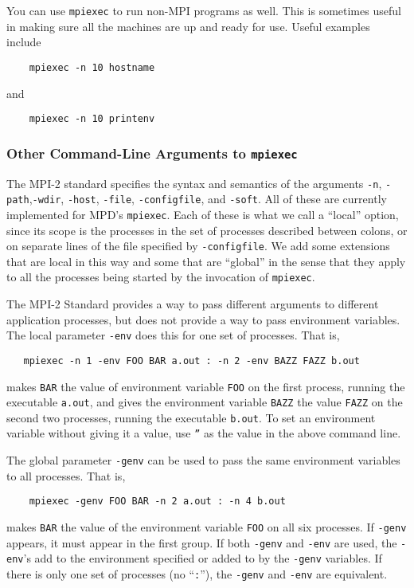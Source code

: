 \documentclass[dvipdfm,11pt]{article}
\begin{document}
You can use \texttt{mpiexec} to run non-MPI programs as well.  This is
sometimes useful in making sure all the machines are up and ready for
use.  Useful examples include
\begin{verbatim}
    mpiexec -n 10 hostname
\end{verbatim}
and
\begin{verbatim}
    mpiexec -n 10 printenv
\end{verbatim}


\subsubsection{Other Command-Line Arguments to \texttt{mpiexec}}
\label{sec:environment}

The MPI-2 standard specifies the syntax and semantics of the arguments
\texttt{-n}, \texttt{-path},\texttt{-wdir}, \texttt{-host},
\texttt{-file}, \texttt{-configfile}, and \texttt{-soft}.  All of these
are currently implemented for MPD's \texttt{mpiexec}.
Each of these is what we call a ``local'' option, since
its scope is the processes in the set of processes described between
colons, or on separate lines of the file specified by
\texttt{-configfile}.  We add some extensions that are local in this way
and some that are ``global'' in the sense that they apply to all the
processes being started by the invocation of \texttt{mpiexec}.

The MPI-2 Standard provides a way to pass different arguments to different
application processes, but does not provide a way to pass environment
variables.  The local parameter \texttt{-env} does this for one set of
processes.  That is,
\begin{verbatim}
   mpiexec -n 1 -env FOO BAR a.out : -n 2 -env BAZZ FAZZ b.out
\end{verbatim}
makes \texttt{BAR} the value of environment variable \texttt{FOO} on the
first process, running the executable \texttt{a.out}, and gives the
environment variable \texttt{BAZZ} the value \texttt{FAZZ} on the second
two processes, running the executable \texttt{b.out}.  To set an
environment variable without giving it a value, use \texttt{''} as the
value in the above command line.

The global parameter \texttt{-genv} can be used to pass the same
environment variables to all processes.  That is,
\begin{verbatim}
    mpiexec -genv FOO BAR -n 2 a.out : -n 4 b.out
\end{verbatim}
makes \texttt{BAR} the value of the environment variable \texttt{FOO} on
all six processes.  If \texttt{-genv} appears, it must appear in the
first group.  If both \texttt{-genv} and \texttt{-env} are used, the
\texttt{-env}'s add to the environment specified or added to by the
\texttt{-genv} variables.  If there is only one set of processes (no
``\texttt{:}''), the \texttt{-genv} and \texttt{-env} are equivalent.
\end{document}
